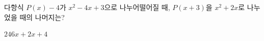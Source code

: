 다항식 $P(x)-4$가 $x^2-4x+3$으로 나누어떨어질 때, $P(x+3)$을 $x^2+2x$로 나누었을 때의 나머지는?
\begin{choices32}{$2$}{$4$}{$6$}{$x+2$}{$x+4$}\end{choices32}
